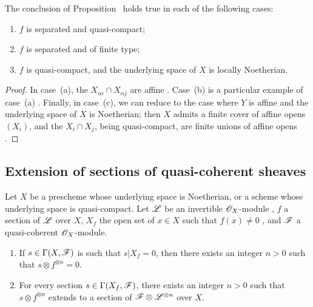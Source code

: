 \begin{corollary}[9.2.2]
\label{1.9.2.2}
The conclusion of Proposition~ holds true in each of the following cases:
\begin{enumerate}[label=\emph{(\alph*)}]
  \item $f$ is separated and quasi-compact;
  \item $f$ is separated and of finite type;
  \item $f$ is quasi-compact, and the underlying space of $X$ is locally Noetherian.
\end{enumerate}
\end{corollary}

\begin{proof}
\label{proof-1.9.2.2}
In case~(a), the $X_{\alpha i}\cap X_{\alpha j}$ are affine .
Case~(b) is a particular example of case~(a) . Finally, in case~(c), we can reduce to the case where $Y$ is affine and the underlying space of $X$ is Noetherian; then $X$ admits a finite cover of affine opens $(X_i)$, and the $X_i\cap X_j$, being quasi-compact, are finite unions of affine opens .
\end{proof}

\subsection{Extension of sections of quasi-coherent sheaves}
\label{subsection:1.9.3}

\begin{theorem}[9.3.1]
\label{1.9.3.1}
Let $X$ be a prescheme whose underlying space is Noetherian, or a scheme whose underlying
space is quasi-compact. Let $\mathscr{L}$ be an invertible $\mathscr{O}_X$-module , $f$ a
section of $\mathscr{L}$ over $X$, $X_f$ the open set of $x\in X$ such that $f(x)\neq0$
, and $\mathscr{F}$ a quasi-coherent $\mathscr{O}_X$-module.
\begin{enumerate}[label=\emph{(\roman*)}]
  \item If $s\in\Gamma(X,\mathscr{F})$ is such that $s|X_f=0$, then there exists an integer $n>0$ such that $s\otimes f^{\otimes n}=0$.
  \item For every section $s\in\Gamma(X_f,\mathscr{F})$, there exists an integer $n>0$ such that $s\otimes f^{\otimes n}$ extends to a section of $\mathscr{F}\otimes\mathscr{L}^{\otimes n}$ over $X$.
\end{enumerate}
\end{theorem}

